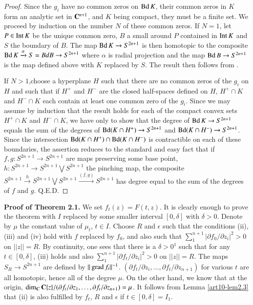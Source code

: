 \begin{proof}
Since the $g_i$ have no common zeros on $\operatorname{Bd} K$, their common zeros in $K$ form an analytic set in $\mathbf{C}^{n+1}$, and $K$ being compact, they must be a finite set. We proceed by induction on the number $N$ of these common zeros. If $N=1$, let $P\in \operatorname{Int} K$ be the unique common zero, $B$ a small around $P$ contained in $\operatorname{Int} K$ and $S$ the boundary of $B$. The map $\operatorname{Bd} K \to S^{2n+1}$ is then homotopic to the composite $\operatorname{Bd} K\xrightarrow{\alpha} S = Bd B \to S^{2n+1}$ where $\alpha$ is radial projection and the map $\operatorname{Bd} B \to S^{2n+1}$ is the map defined above with $K$ replaced by $S$. The result then follows from \cite{art10-key9}.

If $N>1$,\pageoriginale choose a hyperplane $H$ such that there are no common zeros of the $g_i$ on $H$ and such that if $H^+$ and $H^-$ are the closed half-spaces defined on $H$, $H^+ \cap K$ and $H^- \cap K$ each contain at least one common zero of the $g_i$. Since we may assume by induction that the result holds for each of the compact convex sets $H^+ \cap K$ and $H^- \cap K$, we have only to show that the degree of $\operatorname{Bd} K \to S^{2n+1}$ equals the sum of the degrees of $\operatorname{Bd} (K \cap H^+) \to S^{2n+1}$ and $\operatorname{Bd} (K \cap H^-) \to S^{2n+1}$. Since  the intersection $\operatorname{Bd} (K \cap H^+) \cap \operatorname{Bd} (K \cap H^-)$ is contractible on each of these boundaries, the assertion reduces to the standard and easy fact that if $f,g:S^{2n+1} \to S^{2n+1}$ are maps preserving some base point, $h:S^{2n+1} \to S^{2n+1} \bigvee S^{2n+1 }$ the pinching map, the composite $S^{2n+1} \xrightarrow{h} S^{2n+1} \bigvee S^{2n+1} \xrightarrow{(f,g)} S^{2n+1}$ has degree equal to the sum of the degrees of $f$ and $g$. Q.E.D.
\end{proof}


\noindent
{\bf Proof of Theorem 2.1.}
We set $f_t (z) = F (t,z)$. It is clearly enough to prove the theorem with $I$ replaced by some smaller interval $[0,\delta]$ with $\delta >0$. Denote by $\mu$ the constant value of $\mu_t$, $t \in I$. Choose $R$ and $\epsilon$ such that the conditions (ii), (iii) and (iv) hold with $f$ replaced by $f_0$, and also such that $\sum^{n+1}_1 |\partial f_0/ \partial z_i|^2 > 0$ on $||z|| = R$. By continuity, one sees that there is a $\delta > 0^1$ such that for any $t \in [0, \delta]$, (iii) holds and also $\sum^{n+1}_1 |\partial f_t / \partial z_i |^2 > 0$ on $|| z|| = R$. The maps $S_R \to S^{2n+1}$ are defined by $||\operatorname{grad} f_t ||^{-1}$. $(\partial f_t / \partial z_i, \ldots, \partial f_t/ \partial z_{n+1})$ for various $t$ are all homotopic, hence all of the degree $\mu$. On the other hand, we know that at the origin, $\dim_{\mathbf{C}} \mathbf{C}\{z\} / (\partial f_t/ \partial z_1, \ldots, \partial f_t/ \partial z_{n+1}) = \mu$. It follows from Lemma \ref{art10-lem2.3} that (ii) is also fulfilled by $f_t$, $R$ and $\epsilon$ if $t \in [0, \delta] = I_1$.


